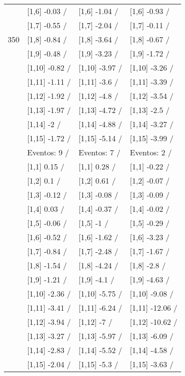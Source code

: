 \begin{table}
\begin{tabular}[t]{llll}
 & {}[1,6] -0.03  / & {}[1,6] -1.04  / & {}[1,6] -0.93  /\\
 & {}[1,7] -0.55  / & {}[1,7] -2.04  / & {}[1,7] -0.11  /\\
350 & {}[1,8] -0.84  / & {}[1,8] -3.64  / & {}[1,8] -0.67  /\\
\addlinespace
 & {}[1,9] -0.48  / & {}[1,9] -3.23  / & {}[1,9] -1.72  /\\
 & {}[1,10] -0.82  / & {}[1,10] -3.97  / & {}[1,10] -3.26  /\\
 & {}[1,11] -1.11  / & {}[1,11] -3.6  / & {}[1,11] -3.39  /\\
 & {}[1,12] -1.92  / & {}[1,12] -4.8  / & {}[1,12] -3.54  /\\
 & {}[1,13] -1.97  / & {}[1,13] -4.72  / & {}[1,13] -2.5  /\\
\addlinespace
 & {}[1,14] -2  / & {}[1,14] -4.88  / & {}[1,14] -3.27  /\\
 & {}[1,15] -1.72  / & {}[1,15] -5.14  / & {}[1,15] -3.99  /\\
 & Eventos:  9 / & Eventos:  7 / & Eventos:  2 /\\
 & {}[1,1] 0.15  / & {}[1,1] 0.28  / & {}[1,1] -0.22  /\\
 & {}[1,2] 0.1  / & {}[1,2] 0.61  / & {}[1,2] -0.07  /\\
\addlinespace
 & {}[1,3] -0.12  / & {}[1,3] -0.08  / & {}[1,3] -0.09  /\\
 & {}[1,4] 0.03  / & {}[1,4] -0.37  / & {}[1,4] -0.02  /\\
 & {}[1,5] -0.06  / & {}[1,5] -1  / & {}[1,5] -0.29  /\\
 & {}[1,6] -0.52  / & {}[1,6] -1.62  / & {}[1,6] -3.23  /\\
 & {}[1,7] -0.84  / & {}[1,7] -2.48  / & {}[1,7] -1.67  /\\
\addlinespace
500 & {}[1,8] -1.54  / & {}[1,8] -4.24  / & {}[1,8] -2.8  /\\
 & {}[1,9] -1.21  / & {}[1,9] -4.1  / & {}[1,9] -4.63  /\\
 & {}[1,10] -2.36  / & {}[1,10] -5.75  / & {}[1,10] -9.08  /\\
 & {}[1,11] -3.41  / & {}[1,11] -6.24  / & {}[1,11] -12.06  /\\
 & {}[1,12] -3.94  / & {}[1,12] -7  / & {}[1,12] -10.62  /\\
\addlinespace
 & {}[1,13] -3.27  / & {}[1,13] -5.97  / & {}[1,13] -6.09  /\\
 & {}[1,14] -2.83  / & {}[1,14] -5.52  / & {}[1,14] -4.58  /\\
 & {}[1,15] -2.04  / & {}[1,15] -5.3  / & {}[1,15] -3.63  /\\
\bottomrule
\end{tabular}
\end{table}
